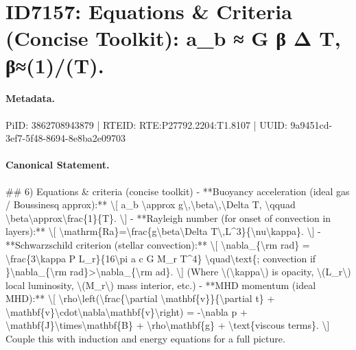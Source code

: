 \section*{ID7157: Equations \& Criteria (Concise Toolkit): a\_b ≈ G β Δ T, β≈(1)/(T).}
\paragraph{Metadata.}
PiID: 3862708943879 | RTEID: RTE:P27792.2204:T1.8107 | UUID: 9a9451cd-3ef7-5f48-8694-8e8ba2e09703

\paragraph{Canonical Statement.}
\#\# 6) Equations \& criteria (concise toolkit) - **Buoyancy acceleration (ideal gas / Boussinesq approx):** \textbackslash{}[ a\_b \textbackslash{}approx g\textbackslash{},\textbackslash{}beta\textbackslash{},\textbackslash{}Delta T, \textbackslash{}qquad \textbackslash{}beta\textbackslash{}approx\textbackslash{}frac\{1\}\{T\}. \textbackslash{}] - **Rayleigh number (for onset of convection in layers):** \textbackslash{}[ \textbackslash{}mathrm\{Ra\}=\textbackslash{}frac\{g\textbackslash{}beta\textbackslash{}Delta T\textbackslash{},L\textasciicircum{}3\}\{\textbackslash{}nu\textbackslash{}kappa\}. \textbackslash{}] - **Schwarzschild criterion (stellar convection):** \textbackslash{}[ \textbackslash{}nabla\_\{\textbackslash{}rm rad\} = \textbackslash{}frac\{3\textbackslash{}kappa P L\_r\}\{16\textbackslash{}pi a c G M\_r T\textasciicircum{}4\} \textbackslash{}quad\textbackslash{}text\{; convection if \}\textbackslash{}nabla\_\{\textbackslash{}rm rad\}>\textbackslash{}nabla\_\{\textbackslash{}rm ad\}. \textbackslash{}] (Where \textbackslash{}(\textbackslash{}kappa\textbackslash{}) is opacity, \textbackslash{}(L\_r\textbackslash{}) local luminosity, \textbackslash{}(M\_r\textbackslash{}) mass interior, etc.) - **MHD momentum (ideal MHD):** \textbackslash{}[ \textbackslash{}rho\textbackslash{}left(\textbackslash{}frac\{\textbackslash{}partial \textbackslash{}mathbf\{v\}\}\{\textbackslash{}partial t\} + \textbackslash{}mathbf\{v\}\textbackslash{}cdot\textbackslash{}nabla\textbackslash{}mathbf\{v\}\textbackslash{}right) = -\textbackslash{}nabla p + \textbackslash{}mathbf\{J\}\textbackslash{}times\textbackslash{}mathbf\{B\} + \textbackslash{}rho\textbackslash{}mathbf\{g\} + \textbackslash{}text\{viscous terms\}. \textbackslash{}] Couple this with induction and energy equations for a full picture.

